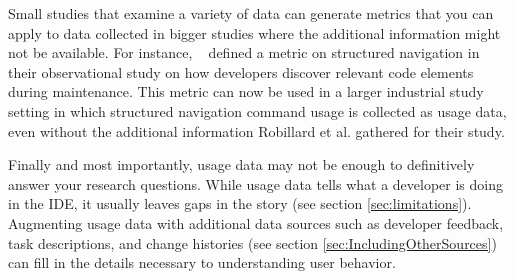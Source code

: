 Small studies that examine a variety of data can generate metrics that you can apply to data collected in bigger studies where the additional information might not be available. 
        For instance, ~ defined a metric on structured navigation in their observational study on how developers discover relevant code elements during maintenance. This metric can now be used in a larger industrial study setting in which structured navigation command usage is collected as usage data, even without the additional information Robillard et al. gathered for their study.

Finally and most importantly, usage data may not be enough to definitively answer your research questions. While usage data tells what a developer is doing in the IDE, it usually leaves gaps in the story (see section \ref{sec:limitations}).  Augmenting usage data with additional data sources such as developer feedback, task descriptions, and change histories (see section \ref{sec:IncludingOtherSources}) can fill in the details necessary to understanding user behavior.


